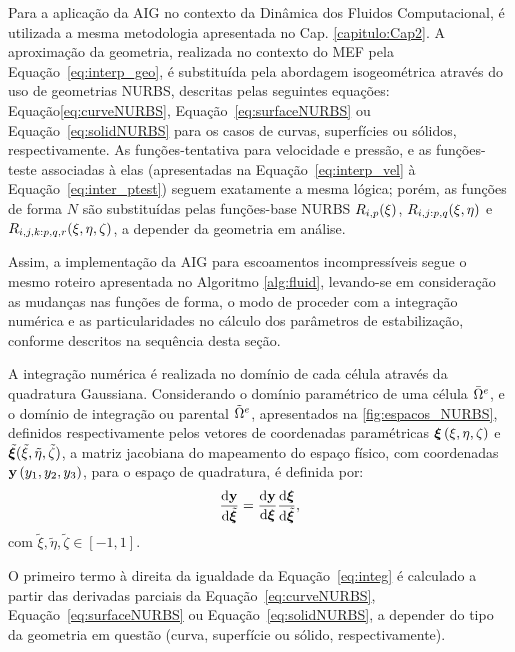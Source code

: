 Para a aplicação da AIG no contexto da Dinâmica dos Fluidos Computacional, é utilizada a mesma metodologia apresentada no Cap. \ref{capitulo:Cap2}. A aproximação da geometria, realizada no contexto do MEF pela Equação~\eqref{eq:interp_geo}, é substituída pela abordagem isogeométrica através do uso de geometrias NURBS, descritas pelas seguintes equações: Equação\eqref{eq:curveNURBS}, Equação~\eqref{eq:surfaceNURBS} ou Equação~\eqref{eq:solidNURBS} para os casos de curvas, superfícies ou sólidos, respectivamente. As funções-tentativa para velocidade e pressão, e as funções-teste associadas à elas (apresentadas na Equação~\eqref{eq:interp_vel} à Equação~\eqref{eq:inter_ptest}) seguem exatamente a mesma lógica; porém, as funções de forma $N$ são substituídas pelas funções-base NURBS $R_{i,p}(\xi)$, $R_{i,j:p,q}(\xi,\eta)$ e $R_{i,j,k:p,q,r}(\xi,\eta,\zeta)$, a depender da geometria em análise.

Assim, a implementação da AIG para escoamentos incompressíveis segue o mesmo roteiro apresentada no Algoritmo \ref{alg:fluid}, levando-se em consideração as mudanças nas funções de forma, o modo de proceder com a integração numérica e as particularidades no cálculo dos parâmetros de estabilização, conforme descritos na sequência desta seção.

A integração numérica é realizada no domínio de cada célula através da quadratura Gaussiana. Considerando o domínio paramétrico de uma célula $\bar{\Omega}^{e}$, e o domínio de integração ou parental $\tilde{\Omega}^{e}$, apresentados na \autoref{fig:espacos_NURBS}, definidos respectivamente pelos vetores de coordenadas paramétricas $\bm{\xi}\left(\xi,\eta,\zeta\right)$ e $\tilde{\bm{\xi}}(\tilde{\xi},\tilde{\eta},\tilde{\zeta})$, a matriz jacobiana do mapeamento do espaço físico, com coordenadas $\mathbf{y} \left(y_1,y_2,y_3\right)$,  para o espaço de quadratura, é definida por:
\begin{align}
\frac{\mathrm{d}\mathbf{y}}{\mathrm{d}\tilde{\bm{\xi}}} = \frac{\mathrm{d}\mathbf{y}}{\mathrm{d}\bm{\xi}} \frac{\mathrm{d}\bm{\xi}}{\mathrm{d}\tilde{\bm{\xi}}}, \label{eq:integ}
\end{align} 
\noindent com $\tilde{\xi}, \tilde{\eta}, \tilde{\zeta} \in [-1, 1]$.

O primeiro termo à direita da igualdade da Equação~\eqref{eq:integ} é calculado a partir das derivadas parciais da Equação~\eqref{eq:curveNURBS}, Equação~\eqref{eq:surfaceNURBS} ou Equação~\eqref{eq:solidNURBS}, a depender do tipo da geometria em questão (curva, superfície ou sólido, respectivamente).


